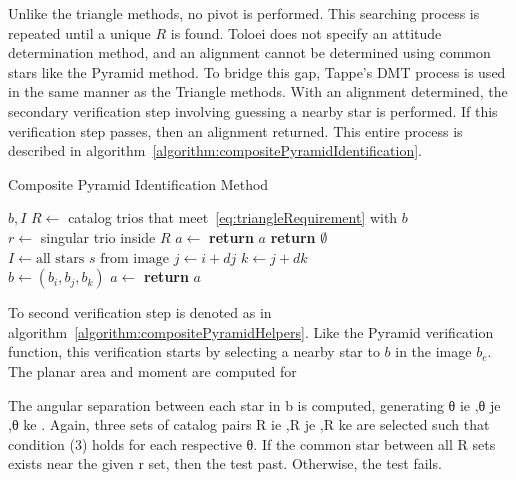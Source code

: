 Unlike the triangle methods, no pivot is performed. This searching process is repeated until a unique $R$ is found.
Toloei does not specify an attitude determination method, and an alignment cannot be determined using common
stars like the Pyramid method. To bridge this gap, Tappe's DMT process is used in the same manner as the Triangle
methods. With an alignment determined, the secondary verification step involving guessing a nearby star is performed.
If this verification step passes, then an alignment returned. This entire process is described in
algorithm~\autoref{algorithm:compositePyramidIdentification}.

\begin{algorithm}
    \caption{Composite Pyramid Identification Method} \label{algorithm:compositePyramidIdentification}
    \begin{algorithmic}[1]
         {$b, I$}
        \State $R \gets $ catalog trios that meet~\eqref{eq:triangleRequirement} with $b$
        \\
        \State $r \gets $ singular trio inside $R$
        \State $a \gets $ 
        \State \textbf{return} $a$
        \EndIf
        \EndIf
        \State \textbf{return } $\emptyset$
        \EndFunction
        \\
        \State $I \gets \text{all stars } s \text{ from image}$
        \State $j \gets i + dj$
        \State $k \gets j + dk$
        \\
        \State $b \gets (b_i, b_j, b_k)$
        \State $a \gets$ 
        \State \textbf{return} $a$
        \EndIf
        \EndFor
        \EndFor
        \EndFor
        \EndProcedure
    \end{algorithmic}
\end{algorithm}

To second verification step is denoted as  in
algorithm~\autoref{algorithm:compositePyramidHelpers}. Like the Pyramid verification function, this verification starts
by selecting a nearby star to $b$ in the image $b_e$. The planar area and moment are computed for

The angular separation
between each star in b is computed, generating θ ie ,θ je ,θ ke .
Again, three sets of catalog pairs R ie ,R je ,R ke are selected
such that condition (3) holds for each respective θ. If the
common star between all R sets exists near the given r set,
then the test past. Otherwise, the test fails.

